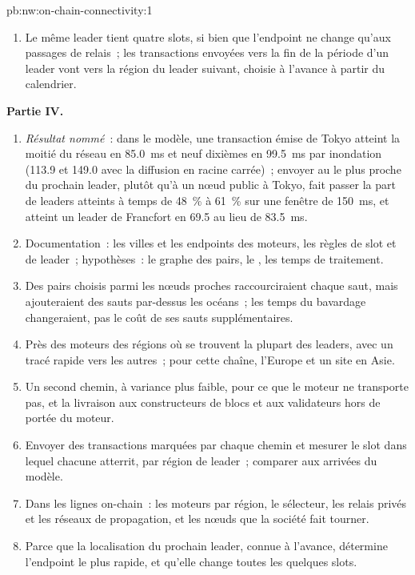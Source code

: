 \begin{solution}{pb:nw:on-chain-connectivity:1}
\begin{enumerate}[resume]
  millisecondes représente alors une part plus petite de la fenêtre.
\item Le même leader tient quatre slots, si bien que l'endpoint ne change qu'aux passages de relais~; les transactions envoyées vers la fin de la période d'un leader vont vers la région du leader suivant,
  choisie à l'avance à partir du calendrier.
\end{enumerate}
\textbf{Partie IV.}
\begin{enumerate}[resume]
\item \emph{Résultat nommé}~: dans le modèle, une transaction émise de Tokyo atteint la moitié du réseau en \qty{85.0}{\milli\second} et neuf dixièmes en
  \qty{99.5}{\milli\second} par inondation (113.9 et 149.0 avec la diffusion en racine carrée)~; envoyer au  le plus proche du prochain leader, plutôt qu'à un nœud public
  à Tokyo, fait passer la part de leaders atteints à temps de 48~\% à 61~\% sur une fenêtre de \qty{150}{\milli\second}, et atteint un leader de Francfort
  en 69.5 au lieu de \qty{83.5}{\milli\second}.
\item Documentation~: les villes et les endpoints des moteurs, les règles de slot et de leader~; hypothèses~: le graphe des pairs, le , les temps de traitement.
\item Des pairs choisis parmi les nœuds proches raccourciraient chaque saut, mais ajouteraient des sauts par-dessus les océans~; les temps du bavardage changeraient, pas le coût de ses sauts supplémentaires.
\item Près des moteurs des régions où se trouvent la plupart des leaders, avec un tracé rapide vers les autres~; pour cette chaîne, l'Europe et un site en Asie.
\item Un second chemin, à variance plus faible, pour ce que le moteur ne transporte pas, et la livraison aux constructeurs de blocs et aux validateurs hors de portée du moteur.
\item Envoyer des transactions marquées par chaque chemin et mesurer le slot dans lequel chacune atterrit, par région de leader~; comparer aux arrivées du modèle.
\item Dans les lignes on-chain~: les moteurs par région, le sélecteur, les relais privés et les réseaux de propagation, et les nœuds que la société fait tourner.
\item Parce que la localisation du prochain leader, connue à l'avance, détermine l'endpoint le plus rapide, et qu'elle change toutes les quelques slots.
\end{enumerate}
\end{solution}

